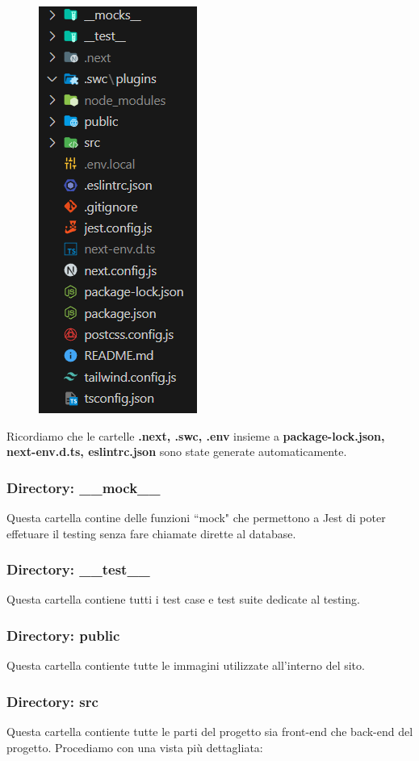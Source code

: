 \documentclass[11pt, a4paper]{article}
\theoremstyle{definition}
\begin{document}
\begin{figure}[H]
\centering
\includegraphics[scale = 1.2]{materiale/Project Structure.png}
\end{figure}

\noindent Ricordiamo che le cartelle \textbf{.next, .swc, .env} insieme a \textbf{package-lock.json, next-env.d.ts, eslintrc.json} sono state generate automaticamente.

\newpage
\subsubsection{Directory: \_\_mock\_\_ }
Questa cartella contine delle funzioni ``mock" che permettono a Jest di poter effetuare il testing senza fare chiamate dirette al database.
\subsubsection{Directory: \_\_test\_\_}
Questa cartella contiene tutti i test case e test suite dedicate al testing.
\subsubsection{Directory: public}
Questa cartella contiente tutte le immagini utilizzate all'interno del sito.
\subsubsection{Directory: src}
Questa cartella contiente tutte le parti del progetto sia front-end che back-end del progetto. Procediamo con una vista più dettagliata:
\end{document}
